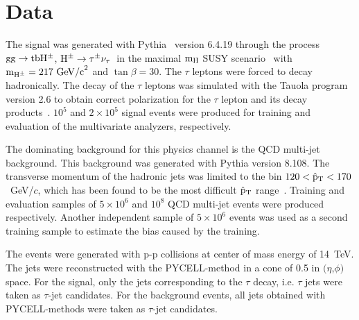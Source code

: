 \documentclass[a4paper]{jpconf}
\newcommand{\Hplustaunu}{\mbox{${\rm H}^{\pm} \to \tau^{\pm}\nu_{\tau}$}}
\begin{document}
\section{Data}\label{sec:data}
The signal was generated with Pythia~\cite{pythia} version 6.4.19
through the process ${\rm gg} \to {\rm tbH^\pm}$,
\Hplustaunu\ in the maximal 
${\rm m}_{\rm H}$ SUSY scenario~\cite{maxsusy} with 
${\rm m}_{{\rm H}^{\pm}}=217~{\rm GeV/c}^2$ and $\tan\beta = 30$.
The $\tau$ leptons were forced to decay hadronically. The decay of the
$\tau$ leptons was simulated with the Tauola program~\cite{tauola}
version 2.6 to obtain correct polarization for the $\tau$ lepton and
its decay products~\cite{taupolarization}. $10^5$ and $2\times 10^5$
signal events were produced for training and evaluation of the
multivariate analyzers, respectively.

The dominating background for this physics channel is the QCD
multi-jet background. This background was generated with 
Pythia version 8.108. The transverse momentum of the hadronic jets was
limited to the bin $120 < \hat{\rm p}_{\rm T} < 170$~GeV/$c$, which
has been found to be the most difficult $\hat{\rm p}_{\rm T}$
range~\cite{ptdrII}. Training and evaluation samples of $5\times 10^6$
and $10^8$ QCD multi-jet events were produced respectively. Another
independent sample of $5\times 10^6$ events was used as a second
training sample to estimate the bias caused by the training.

The events were generated with p-p collisions at center of mass energy
of 14~TeV. The jets were reconstructed with the PYCELL-method in a
cone of 0.5 in $(\eta$,$\phi)$ space. For the signal, only the jets
corresponding to the $\tau$ decay, i.e. $\tau$ jets were taken as
$\tau$-jet candidates. For the background events, all jets obtained
with PYCELL-methods were taken as $\tau$-jet candidates.
\end{document}
